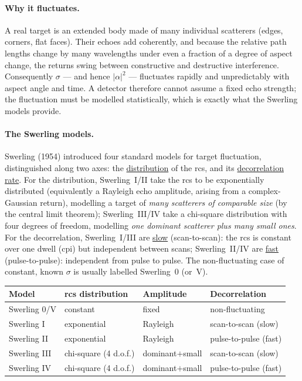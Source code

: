 \documentclass{article}
\begin{document}
\paragraph{Why it fluctuates.}
A real target is an extended body made of many individual scatterers (edges, corners, flat faces). Their echoes add coherently, and because the relative path lengths change by many wavelengths under even a fraction of a degree of aspect change, the returns swing between constructive and destructive interference. Consequently $\sigma$ --- and hence $|\alpha|^2$ --- fluctuates rapidly and unpredictably with aspect angle and time. A detector therefore cannot assume a fixed echo strength; the fluctuation must be modelled statistically, which is exactly what the Swerling models provide.

\paragraph{The Swerling models.}
Swerling (1954) introduced four standard models for target fluctuation, distinguished along two axes: the \underline{distribution} of the \gls{rcs}, and its \underline{decorrelation rate}. For the distribution, Swerling~I/II take the \gls{rcs} to be exponentially distributed (equivalently a Rayleigh echo amplitude, arising from a complex-Gaussian return), modelling a target of \emph{many scatterers of comparable size} (by the central limit theorem); Swerling~III/IV take a chi-square distribution with four degrees of freedom, modelling \emph{one dominant scatterer plus many small ones}. For the decorrelation, Swerling~I/III are \underline{slow} (scan-to-scan): the \gls{rcs} is constant over one dwell (\gls{cpi}) but independent between scans; Swerling~II/IV are \underline{fast} (pulse-to-pulse): independent from pulse to pulse. The non-fluctuating case of constant, known $\sigma$ is usually labelled Swerling~0 (or~V).
\begin{center}
\begin{tabular}{llll}
\hline
Model & \gls{rcs} distribution & Amplitude & Decorrelation \\
\hline
Swerling 0/V & constant & fixed & non-fluctuating \\
Swerling I   & exponential & Rayleigh & scan-to-scan (slow) \\
Swerling II  & exponential & Rayleigh & pulse-to-pulse (fast) \\
Swerling III & chi-square (4 d.o.f.) & dominant$+$small & scan-to-scan (slow) \\
Swerling IV  & chi-square (4 d.o.f.) & dominant$+$small & pulse-to-pulse (fast) \\
\hline
\end{tabular}
\end{center}
\end{document}
